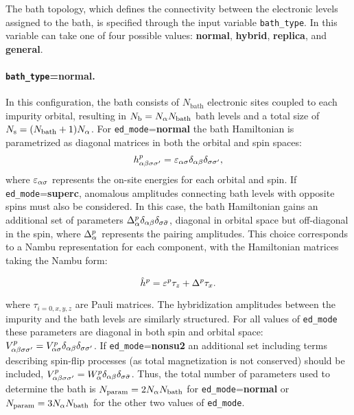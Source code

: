 \documentclass[edipack_sp.tex]{subfiles}
\begin{document}
The bath topology, which defines the connectivity between the
electronic levels assigned to the bath, is specified
through the input variable {\tt bath\_type}. In \NAME this variable can take one of four possible values: {\bf normal}, {\bf hybrid}, {\bf replica}, and {\bf general}.

\paragraph{{\tt bath\_type}={\bf normal}.} In this configuration, the
bath consists of $N_\mathrm{bath}$
electronic sites coupled to each impurity orbital, resulting
in $N_\mathrm{b} = N_\alpha N_\mathrm{bath}$ bath levels and a total size of $N_\mathrm{s}=(N_\mathrm{bath}+1)N_\alpha$.
For {\tt ed\_mode}={\bf normal} the bath Hamiltonian is parametrized as diagonal matrices in both the orbital and spin spaces:
$$
h^p_{\alpha\beta\sigma\sigma'}=\varepsilon_{\alpha\sigma}\delta_{\alpha\beta}\delta_{\sigma\sigma'},
$$
where $\varepsilon_{\alpha\sigma}$ represents  the on-site energies for each orbital and spin. 
%
If {\tt ed\_mode}={\bf superc},  anomalous
amplitudes connecting bath levels with opposite spins must also be
considered. In this case, the bath Hamiltonian gains 
an additional set of parameters $\Delta^p_{\alpha}\delta_{\alpha\beta}\delta_{\sigma \bar{\sigma}}$, diagonal in orbital space but
off-diagonal in the spin, where $\Delta^p_\alpha$ represents the pairing amplitudes. 
This choice corresponds to a Nambu representation for each  component, with the Hamiltonian matrices taking the Nambu form:

$$
\hat{h}^p = \varepsilon^p\tau_z + \Delta^p\tau_x .
$$

where $\tau_{i=0,x,y,z}$ are Pauli matrices.
%
The hybridization amplitudes between the impurity and the bath levels
are similarly structured. For all values of {\tt ed\_mode} these
parameters are diagonal in both
spin and orbital space: $V^p_{\alpha\beta\sigma\sigma'}=V^p_{\alpha\sigma}\delta_{\alpha\beta}\delta_{\sigma\sigma'}$.
%
If {\tt ed\_mode}={\bf nonsu2}  an additional set including terms describing spin-flip processes (as total magnetization is not conserved) should be included, $V^p_{\alpha\beta\sigma\sigma'} =
W^p_{\alpha}\delta_{\alpha\beta}\delta_{\sigma \bar{\sigma}}$. 
%
Thus, the total number of parameters used to determine the bath is $N_\mathrm{param}=2N_\alpha N_\mathrm{bath}$ for {\tt ed\_mode}={\bf normal} or $N_\mathrm{param}=3N_\alpha N_\mathrm{bath}$ for the other two values of {\tt ed\_mode}.
\end{document}
